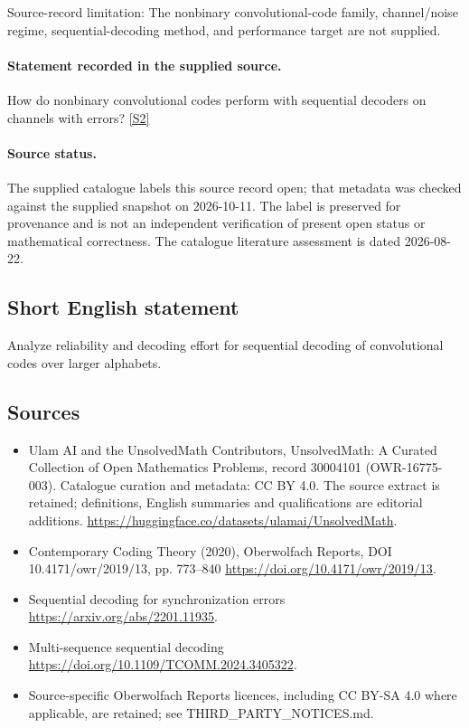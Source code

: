 \documentclass[11pt]{article}
\begin{document}
Source-record limitation: The nonbinary convolutional-code family, channel/noise regime, sequential-decoding method, and performance target are not supplied.
\paragraph{Statement recorded in the supplied source.}
How do nonbinary convolutional codes perform with sequential decoders on channels with errors? \href{https://doi.org/10.4171/owr/2019/13}{[S2]}
\paragraph{Source status.}
The supplied catalogue labels this source record open; that metadata was checked against the supplied snapshot on 2026-10-11. The label is preserved for provenance and is not an independent verification of present open status or mathematical correctness. The catalogue literature assessment is dated 2026-08-22.
\subsection{Short English statement}
Analyze reliability and decoding effort for sequential decoding of convolutional codes over larger alphabets.
\subsection{Sources}
\begin{itemize}
\item[S1] Ulam AI and the UnsolvedMath Contributors, UnsolvedMath: A Curated Collection of Open Mathematics Problems, record 30004101 (OWR-16775-003). Catalogue curation and metadata: CC BY 4.0. The source extract is retained; definitions, English summaries and qualifications are editorial additions.
\url{https://huggingface.co/datasets/ulamai/UnsolvedMath}.
\item[S2] Contemporary Coding Theory (2020), Oberwolfach Reports, DOI 10.4171/owr/2019/13, pp. 773--840
\url{https://doi.org/10.4171/owr/2019/13}.
\item[S3] Sequential decoding for synchronization errors
\url{https://arxiv.org/abs/2201.11935}.
\item[S4] Multi-sequence sequential decoding
\url{https://doi.org/10.1109/TCOMM.2024.3405322}.
\item Source-specific Oberwolfach Reports licences, including CC BY-SA 4.0 where applicable, are retained; see THIRD\_PARTY\_NOTICES.md.
\end{itemize}
\end{document}
